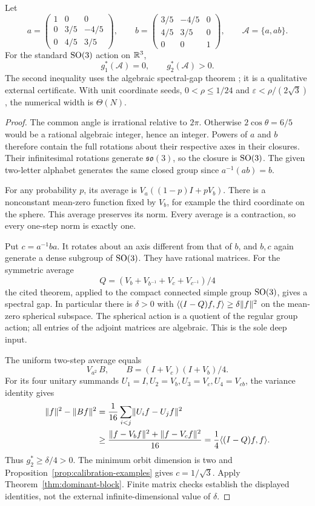 \begin{theorem}
\label{thm:binary-example}
Let
\[
 a=\begin{pmatrix}1&0&0\\0&3/5&-4/5\\0&4/5&3/5\end{pmatrix},\qquad
 b=\begin{pmatrix}3/5&-4/5&0\\4/5&3/5&0\\0&0&1\end{pmatrix},
 \qquad \mathcal A=\{a,ab\}.
\]
For the standard $\operatorname{SO}(3)$ action on $\mathbb R^3$,
\[
 g_1^*(\mathcal A)=0,\qquad g_2^*(\mathcal A)>0.
\]
The second inequality uses the algebraic spectral-gap theorem \cite[Theorem 1.2]{BdS}; it is a qualitative external certificate. With unit coordinate seeds, $0<\rho\le1/24$ and $\varepsilon<\rho/(2\sqrt3)$, the numerical width is $\Theta(N)$.
\end{theorem}
\begin{proof}
The common angle is irrational relative to $2\pi$. Otherwise $2\cos\theta=6/5$ would be a rational algebraic integer, hence an integer. Powers of $a$ and $b$ therefore contain the full rotations about their respective axes in their closures. Their infinitesimal rotations generate $\mathfrak{so}(3)$, so the closure is $\operatorname{SO}(3)$. The given two-letter alphabet generates the same closed group since $a^{-1}(ab)=b$.

For any probability $p$, its average is
$V_a((1-p)I+pV_b)$. There is a nonconstant mean-zero function fixed by $V_b$, for example the third coordinate on the sphere. This average preserves its norm. Every average is a contraction, so every one-step norm is exactly one.

Put $c=a^{-1}ba$. It rotates about an axis different from that of $b$, and $b,c$ again generate a dense subgroup of $\operatorname{SO}(3)$. They have rational matrices. For the symmetric average
\[
 Q=(V_b+V_{b^{-1}}+V_c+V_{c^{-1}})/4
\]
the cited theorem, applied to the compact connected simple group $\operatorname{SO}(3)$, gives a spectral gap. In particular there is $\delta>0$ with
$\langle(I-Q)f,f\rangle\ge\delta\lVert f\rVert^2$ on the mean-zero spherical subspace. The spherical action is a quotient of the regular group action; all entries of the adjoint matrices are algebraic. This is the sole deep input.

The uniform two-step average equals
\[
 V_{a^2}\,B,\qquad B=(I+V_c)(I+V_b)/4.
\]
For its four unitary summands $U_1=I,U_2=V_b,U_3=V_c,U_4=V_{cb}$, the variance identity gives
\begin{align*}
 \lVert f\rVert^2-\lVert Bf\rVert^2
 &=\frac1{16}\sum_{i<j}\lVert U_if-U_jf\rVert^2\\
 &\ge\frac{\lVert f-V_bf\rVert^2+\lVert f-V_cf\rVert^2}{16}
 =\frac14\langle(I-Q)f,f\rangle.
\end{align*}
Thus $g_2^*\ge\delta/4>0$. The minimum orbit dimension is two and Proposition~\ref{prop:calibration-examples} gives $c=1/\sqrt3$. Apply Theorem~\ref{thm:dominant-block}. Finite matrix checks establish the displayed identities, not the external infinite-dimensional value of $\delta$.
\end{proof}
